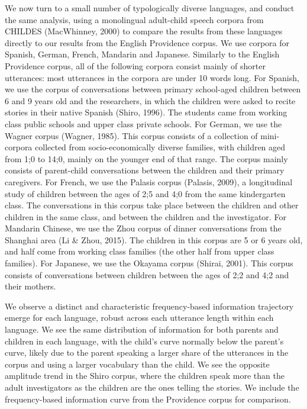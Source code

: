 \documentclass[man,floatsintext]{apa6}
\begin{document}
We now turn to a small number of typologically diverse languages, and conduct the same analysis, using a monolingual adult-child speech corpora from CHILDES (MacWhinney, 2000) to compare the results from these languages directly to our results from the English Providence corpus. We use corpora for Spanish, German, French, Mandarin and Japanese. Similarly to the English Providence corpus, all of the following corpora consist mainly of shorter utterances: most utterances in the corpora are under 10 words long. For Spanish, we use the corpus of conversations between primary school-aged children between 6 and 9 years old and the researchers, in which the children were asked to recite stories in their native Spanish (Shiro, 1996). The students came from working class public schools and upper class private schools. For German, we use the Wagner corpus (Wagner, 1985). This corpus consists of a collection of mini-corpora collected from socio-economically diverse families, with children aged from 1;0 to 14;0, mainly on the younger end of that range. The corpus mainly consists of parent-child conversations between the children and their primary caregivers. For French, we use the Palasis corpus (Palasis, 2009), a longitudinal study of children between the ages of 2;5 and 4;0 from the same kindergarten class. The conversations in this corpus take place between the children and other children in the same class, and between the children and the investigator. For Mandarin Chinese, we use the Zhou corpus of dinner conversations from the Shanghai area (Li \& Zhou, 2015). The children in this corpus are 5 or 6 years old, and half come from working class families (the other half from upper class families). For Japanese, we use the Okayama corpus (Shirai, 2001). This corpus consists of conversations between children between the ages of 2;2 and 4;2 and their mothers.

We observe a distinct and characteristic frequency-based information trajectory emerge for each language, robust across each utterance length within each language. We see the same distribution of information for both parents and children in each language, with the child's curve normally below the parent's curve, likely due to the parent speaking a larger share of the utterances in the corpus and using a larger vocabulary than the child. We see the opposite amplitude trend in the Shiro corpus, where the children speak more than the adult investigators as the children are the ones telling the stories. We include the frequency-based information curve from the Providence corpus for comparison.
\end{document}
